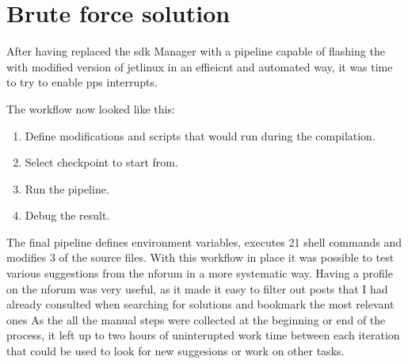 \section{Brute force solution}
After having replaced the \gls{sdk} Manager with a pipeline capable of flashing the \jx with modified version of
\gls{jetlinux} in an effieicnt and automated way, it was time to try to enable \gls{pps} interrupts.

The workflow now looked like this:
\begin{enumerate}
    \item Define modifications and scripts that would run during the compilation.
    \item Select checkpoint to start from.
    \item Run the pipeline.
    \item Debug the result.
\end{enumerate}

The final pipeline defines environment variables, executes 21 shell commands and modifies 3 of the source files.
With this workflow in place it was possible to test various suggestions from the \gls{nforum} in a more systematic way.
Having a profile on the \gls{nforum} was very useful, as it made it easy to filter out posts that I had already consulted when searching for solutions and bookmark the most relevant ones \cite{nvidiaNvidiaForumExtended2023}
As the all the manual steps were collected at the beginning or end of the process, it left up to two hours of uninterupted work time between each iteration that could be used to look for new suggesions or work on other tasks.

